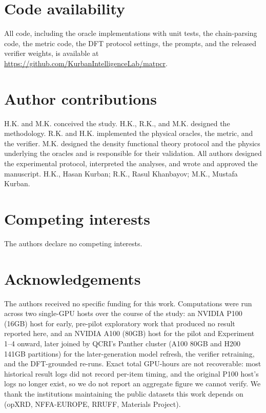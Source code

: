 \documentclass[pdflatex,sn-nature]{sn-jnl}
\begin{document}
\section*{Code availability}
All code, including the oracle implementations with unit tests, the chain-parsing
code, the metric code, the DFT protocol settings, the prompts, and the released
verifier weights, is available at \url{https://github.com/KurbanIntelligenceLab/matpcr}.

\section*{Author contributions}
H.K. and M.K. conceived the study. H.K., R.K., and M.K. designed the methodology.
R.K. and H.K. implemented the physical oracles, the metric, and the verifier. M.K.
designed the density functional theory protocol and the physics underlying the oracles
and is responsible for their validation. All authors designed the experimental protocol,
interpreted the analyses, and wrote and approved the manuscript. H.K., Hasan Kurban; R.K., Rasul
Khanbayov; M.K., Mustafa Kurban.

\section*{Competing interests}
The authors declare no competing interests.

\section*{Acknowledgements}
The authors received no specific funding for this work.
Computations were run across two single-GPU hosts over the course of the study: an NVIDIA
P100 (16GB) host for early, pre-pilot exploratory work that produced no result reported
here, and an NVIDIA A100 (80GB) host for the pilot and Experiment 1--4 onward, later joined
by QCRI's Panther cluster (A100 80GB and H200 141GB partitions) for the
later-generation model refresh, the verifier retraining, and the DFT-grounded re-runs. Exact
total GPU-hours are not recoverable: most historical result logs did not record per-item
timing, and the original P100 host's logs no longer exist, so we do not report an aggregate
figure we cannot verify. We thank the institutions maintaining the public datasets this
work depends on (opXRD, NFFA-EUROPE, RRUFF, Materials Project).


\end{document}
